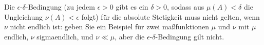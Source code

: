 
\begin{exercise}

Die $\epsilon$-$\delta$-Bedingung (zu jedem $\epsilon > 0$ gibt es ein $\delta > 0$, sodass aus $\mu(A) < \delta$ die Ungleichung $\nu(A) < \epsilon$ folgt) für die absolute Stetigkeit muss nicht gelten, wenn $\nu$ nicht endlich ist:
geben Sie ein Beispiel für zwei maßfunktionen $\mu$ und $\nu$ mit $\mu$ endlich, $\nu$ sigmaendlich, und $\nu \ll \mu$, aber die $\epsilon$-$\delta$-Bedingung gilt nicht.

\end{exercise}


